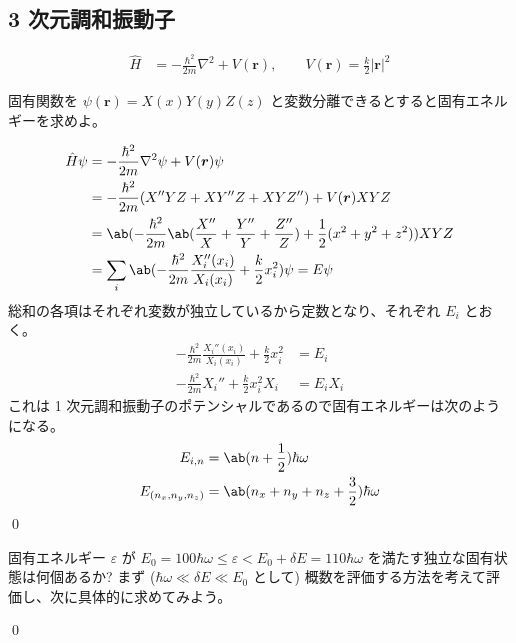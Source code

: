 \documentclass[uplatex,dvipdfmx,a4paper,11pt]{jlreq}
\makeatletter
\newcommand{\rr}{\bm{r}}
\newcommand{\laplacian}{\nabla^2}
\numberwithin{equation}{section}
\theoremstyle{definition}
\renewenvironment{proof}[1][\proofname]{\par
  \normalfont
  \topsep6\p@\@plus6\p@ \trivlist
  \item[\hskip\labelsep{\bfseries #1}\@addpunct{\bfseries}]\ignorespaces\quad\par
}{%
  \qed\endtrivlist\@endpefalse
}
\renewcommand\proofname{証明}
\makeatother
\begin{document}
\subsection{3 次元調和振動子}
\begin{align}
  \hat{H} & = -\frac{\hbar^2}{2m}\laplacian + V(\rr), \qquad V(\rr) = \frac{k}{2}|\rr|^2
\end{align}
\begin{problem}
固有関数を $\psi(\rr) = X(x)Y(y)Z(z)$ と変数分離できるとすると固有エネルギーを求めよ。
\end{problem}
\begin{proof}
  \begin{align}
    \hat{H}\psi & = -\frac{\hbar^2}{2m}\laplacian\psi + V(\rr)\psi                                                               \\
                & = -\frac{\hbar^2}{2m}(X''YZ + XY''Z + XYZ'') + V(\rr)XYZ                                                       \\
                & = \ab(-\frac{\hbar^2}{2m}\ab(\frac{X''}{X} + \frac{Y''}{Y} + \frac{Z''}{Z}) + \frac{1}{2}(x^2 + y^2 + z^2))XYZ \\
                & = \sum_{i}\ab(-\frac{\hbar^2}{2m}\frac{X_i''(x_i)}{X_i(x_i)} + \frac{k}{2}x_i^2)\psi = E\psi
  \end{align}
  総和の各項はそれぞれ変数が独立しているから定数となり、それぞれ $E_i$ とおく。
  \begin{align}
    -\frac{\hbar^2}{2m}\frac{X_i''(x_i)}{X_i(x_i)} + \frac{k}{2}x_i^2 & = E_i    \\
    -\frac{\hbar^2}{2m}X_i'' + \frac{k}{2}x_i^2X_i                    & = E_iX_i
  \end{align}
  これは 1 次元調和振動子のポテンシャルであるので固有エネルギーは次のようになる。
  \begin{align}
    E_{i,n}             & = \ab(n + \frac{1}{2})\hbar\omega               \\
    E_{(n_x, n_y, n_z)} & = \ab(n_x + n_y + n_z + \frac{3}{2})\hbar\omega
  \end{align}
\end{proof}

\begin{problem}
固有エネルギー $\varepsilon$ が $E_0 = 100\hbar\omega \leq \varepsilon < E_0 + \delta E = 110\hbar\omega$ を満たす独立な固有状態は何個あるか? まず ($\hbar\omega\ll \delta E \ll E_0$ として) 概数を評価する方法を考えて評価し、次に具体的に求めてみよう。
\end{problem}
\begin{proof}

\end{proof}
\end{document}
